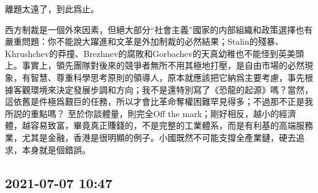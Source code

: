 \documentclass[twocolumn]{ctexart}
\begin{document}
離題太遠了，到此爲止。

西方制裁是一個外來因素，但絕大部分“社會主義”國家的内部組織和政策選擇也有嚴重問題：你不能說大躍進和文革是外加制裁的必然結果；Stalin的殘暴、Khrushchev的莽撞、Brezhnev的腐敗和Gorbachev的天真幼稚也不能怪到英美頭上。事實上，領先團隊對後來的競爭者無所不用其極地打壓，是自由市場的必然現象，有智慧、尊重科學思考原則的領導人，原本就應該把它納爲主要考慮，事先根據客觀環境來決定發展步調和方向；我不是還特別寫了《恐龍的起源》嗎？當然，這依舊是件極爲艱巨的任務，所以才會比革命奪權困難罕見得多；不過那不正是我所説的重點嗎？
至於你談體量，則完全Off the mark；剛好相反，越小的經濟體，越容易致富，畢竟真正賺錢的，不是完整的工業體系，而是有利基的高端服務業，尤其是金融，香港是很明顯的例子。小國既然不可能支撐全產業鏈，硬去追求，本身就是個錯誤。
\subsection*{2021-07-07 10:47}
\end{document}

